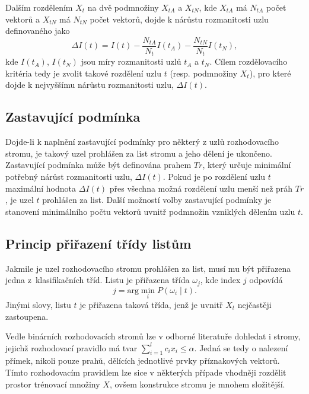 {\par{Dalším rozdělením $X_t$ na dvě podmnožiny $X_{tA}$ a $X_{tN}$, kde $X_{tA}$ má $N_{tA}$ počet vektorů a $X_{tN}$ má $N_{tN}$ počet vektorů, dojde k nárůstu rozmanitosti uzlu definovaného jako
\begin{equation}
	{\Delta I\left( t\right) = I\left( t\right)-\frac{N_{tA}}{N_t}I\left( t_A\right)-\frac{N_{tN}}{N_t}I\left( t_N\right),}
\end{equation}
kde $I\left( t_A\right)$, $I\left( t_N\right)$ jsou míry rozmanitosti uzlů $t_A$ a $t_N$. Cílem rozdělovacího kritéria tedy  je zvolit takové rozdělení uzlu $t$ (resp. podmnožiny $X_t$), pro které dojde k nejvyššímu nárůstu rozmanitosti uzlu, $\Delta I\left( t\right)$.}

\subsection*{Zastavující podmínka}
\par{Dojde-li k naplnění zastavující podmínky pro některý z uzlů rozhodovacího stromu, je takový uzel prohlášen za list stromu a jeho dělení je ukončeno. Zastavující podmínka může být definována prahem $Tr$, který určuje minimální potřebný nárůst rozmanitosti uzlu, $\Delta I\left( t\right)$. Pokud je po rozdělení uzlu $t$ maximální hodnota $\Delta I\left( t\right)$ přes všechna možná rozdělení uzlu menší než práh $Tr$, je uzel $t$ prohlášen za list. Další možností volby zastavující podmínky je stanovení minimálního počtu vektorů uvnitř podmnožin vzniklých dělením uzlu $t$.}

\subsection*{Princip přiřazení třídy listům}
\par{Jakmile je uzel rozhodovacího stromu prohlášen za list, musí mu být přiřazena jedna z~klasifikačních tříd. Listu je přiřazena třída $\omega_j$, kde index $j$ odpovídá
\begin{equation}
	{j=\mathrm{arg}\min_i P\left(\omega_i\mid t\right).}
\end{equation}
Jinými slovy, listu $t$ je přiřazena taková třída, jenž je uvnitř $X_t$ nejčastěji zastoupena.}

\par{Vedle binárních rozhodovacích stromů lze v odborné literatuře dohledat i stromy, jejichž rozhodovací pravidlo má tvar $\sum_{i=1}^lc_i x_i\leq\alpha$. Jedná se tedy o nalezení přímek, nikoli pouze prahů, dělících jednotlivé prvky příznakových vektorů. Tímto rozhodovacím pravidlem lze sice v některých případe vhodněji rozdělit prostor trénovací množiny $X$, ovšem konstrukce stromu je mnohem složitější.}

}

